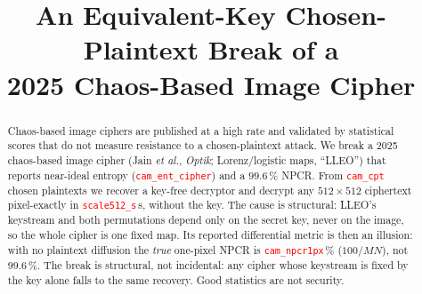 \documentclass[conference,a4paper]{IEEEtran}
\newcommand{\PH}[1]{\textcolor{red}{\texttt{#1}}}
\begin{document}
\title{An Equivalent-Key Chosen-Plaintext Break of a\\
2025 Chaos-Based Image Cipher}

%
\author{
}

\maketitle
\thispagestyle{empty}
\pagestyle{empty}


\begin{abstract}
\boldmath
Chaos-based image ciphers are published at a high rate and validated by statistical scores that do not
measure resistance to a chosen-plaintext attack. We break a 2025 chaos-based image cipher (Jain
\emph{et al.}, \emph{Optik}; Lorenz/logistic maps, ``LLEO'') that reports near-ideal entropy
(\PH{cam_ent_cipher}) and a $99.6\,\%$ NPCR. From \PH{cam_cpt} chosen plaintexts we recover a key-free
decryptor and decrypt any $512{\times}512$ ciphertext pixel-exactly in \PH{scale512_s}\,s, without the key. The cause is structural: LLEO's keystream and both
permutations depend only on the secret key, never on the image, so the whole cipher is one fixed map. Its
reported differential metric is then an illusion: with no plaintext diffusion the \emph{true} one-pixel
NPCR is \PH{cam_npcr1px}\,\% ($100/MN$), not $99.6\,\%$. The break is structural, not incidental: any
cipher whose keystream is fixed by the key alone falls to the same recovery. Good statistics are not
security.
\end{abstract}
\end{document}
